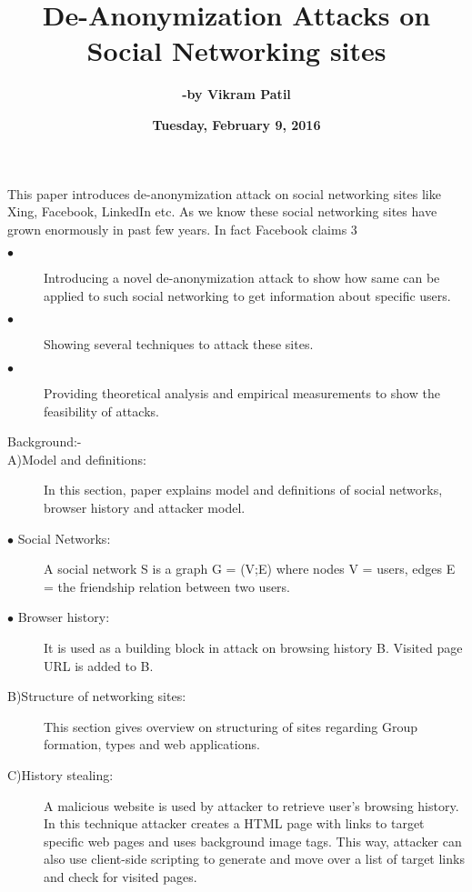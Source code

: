 \documentclass{article}
\title{\textbf {De-Anonymization Attacks on Social Networking sites}}
\author{\textbf {-by Vikram Patil}}
\date{\textbf {Tuesday, February 9, 2016}}
\begin{document}
\maketitle
This paper introduces de-anonymization attack on social networking sites like Xing, Facebook, LinkedIn etc. As we know these social networking sites have grown enormously in past few years. In fact Facebook claims 3%
\begin{description}
\item[$\bullet$ ]	Introducing a novel de-anonymization attack to show how same can be applied to such social networking to get information about specific users.
\item[$\bullet$ ]	Showing several techniques to attack these sites.
\item[$\bullet$ ]	Providing theoretical analysis and empirical measurements to show the feasibility of attacks.\\


\item[Background:-]
\item[A)Model and definitions:]
In this section, paper explains model and definitions of social networks, browser history and attacker model. 
\item[$\bullet$ Social Networks:]	 A social network S is a graph G = (V;E) where nodes V = users, edges E = the friendship relation between two users.
\item[$\bullet$ Browser history:]	 It is used as a building block in attack on browsing history B. Visited page URL is added to B.\\

\item[B)Structure of networking sites:]
\item[]This section gives overview on structuring of sites regarding Group formation, types and web applications.
\item[C)History stealing:]
\item[]A malicious website is used by attacker to retrieve user’s browsing history. In this technique attacker creates a HTML page with links to target specific web pages and uses background image tags. This way, attacker can also use client-side scripting to generate and move over a list of target links and check for visited pages.\\


\end{description}
\end{document}
